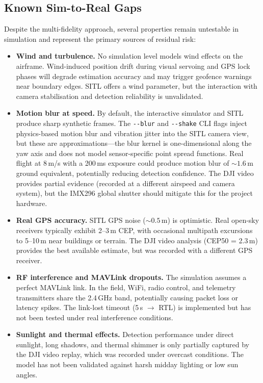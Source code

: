 \subsection{Known Sim-to-Real Gaps}\label{sec:known-gaps}

Despite the multi-fidelity approach, several properties remain untestable in simulation and represent the primary sources of residual risk:

\begin{itemize}
    \item \textbf{Wind and turbulence.} No simulation level models wind effects on the airframe. Wind-induced position drift during visual servoing and GPS lock phases will degrade estimation accuracy and may trigger geofence warnings near boundary edges. SITL offers a wind parameter, but the interaction with camera stabilisation and detection reliability is unvalidated.

    \item \textbf{Motion blur at speed.} By default, the interactive simulator and SITL produce sharp synthetic frames. The \texttt{-{}-blur} and \texttt{-{}-shake} CLI flags inject physics-based motion blur and vibration jitter into the SITL camera view, but these are approximations---the blur kernel is one-dimensional along the yaw axis and does not model sensor-specific point spread functions. Real flight at 8\,m/s with a 200\,ms exposure could produce motion blur of ${\sim}1.6$\,m ground equivalent, potentially reducing detection confidence. The DJI video provides partial evidence (recorded at a different airspeed and camera system), but the IMX296 global shutter should mitigate this for the project hardware.

    \item \textbf{Real GPS accuracy.} SITL GPS noise (${\sim}0.5$\,m) is optimistic. Real open-sky receivers typically exhibit 2--3\,m CEP, with occasional multipath excursions to 5--10\,m near buildings or terrain. The DJI video analysis (CEP50 = 2.3\,m) provides the best available estimate, but was recorded with a different GPS receiver.

    \item \textbf{RF interference and MAVLink dropouts.} The simulation assumes a perfect MAVLink link. In the field, WiFi, radio control, and telemetry transmitters share the 2.4\,GHz band, potentially causing packet loss or latency spikes. The link-lost timeout (5\,s $\to$ RTL) is implemented but has not been tested under real interference conditions.

    \item \textbf{Sunlight and thermal effects.} Detection performance under direct sunlight, long shadows, and thermal shimmer is only partially captured by the DJI video replay, which was recorded under overcast conditions. The model has not been validated against harsh midday lighting or low sun angles.
\end{itemize}

